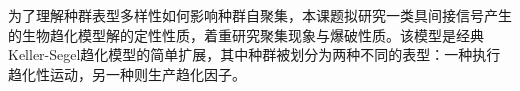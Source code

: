 \documentclass[12pt]{article}
\begin{document}
为了理解种群表型多样性如何影响种群自聚集，本课题拟研究一类具间接信号产生的生物趋化模型解的定性性质，着重研究聚集现象与爆破性质。该模型是经典Keller-Segel趋化模型的简单扩展，其中种群被划分为两种不同的表型：一种执行趋化性运动，另一种则生产趋化因子。




\end{document}
